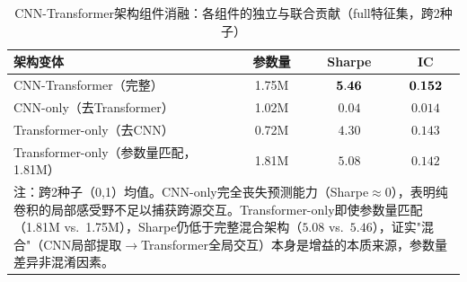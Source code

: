 \begin{table}[H]
\centering
\caption{CNN-Transformer架构组件消融：各组件的独立与联合贡献（full特征集，跨2种子）}
\label{tab:arch_ablation}
\small
\setlength{\tabcolsep}{3pt}
\begin{tabular}{lccc}
\toprule
架构变体 & 参数量 & Sharpe & IC \\
\midrule
CNN-Transformer（完整）& 1.75M & $\bf 5.46$ & $\bf 0.152$ \\
CNN-only（去Transformer）& 1.02M & $0.04$ & $0.014$ \\
Transformer-only（去CNN）& 0.72M & $4.30$ & $0.143$ \\
Transformer-only（参数量匹配，1.81M）& 1.81M & $5.08$ & $0.142$ \\
\bottomrule
\multicolumn{4}{p{\textwidth}}{\footnotesize 注：跨2种子（0,1）均值。CNN-only完全丧失预测能力（Sharpe$\approx$0），表明纯卷积的局部感受野不足以捕获跨源交互。Transformer-only即使参数量匹配（1.81M vs.\ 1.75M），Sharpe仍低于完整混合架构（$5.08$ vs.\ $5.46$），证实"混合"（CNN局部提取$\to$Transformer全局交互）本身是增益的本质来源，参数量差异非混淆因素。}\\
\end{tabular}
\end{table}

